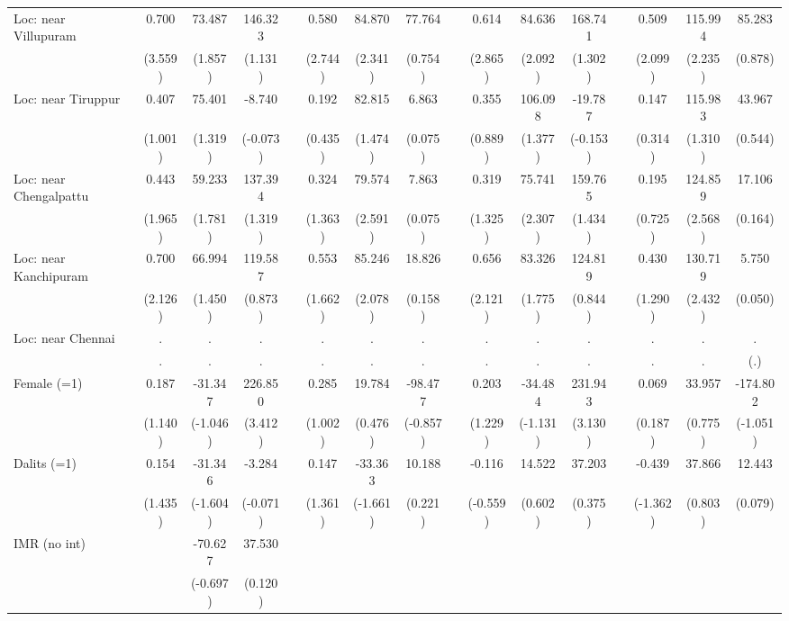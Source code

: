 {\begin{longtable}{@{\extracolsep{\fill}}lccccccccccccccc}
    Loc: near Villupuram & 0.700 & 73.487 & 146.323 &   & 0.580 & 84.870 & 77.764 &   & 0.614 & 84.636 & 168.741 &   & 0.509 & 115.994 & 85.283 \\
      & (3.559) & (1.857) & (1.131) &   & (2.744) & (2.341) & (0.754) &   & (2.865) & (2.092) & (1.302) &   & (2.099) & (2.235) & (0.878) \\
    Loc: near Tiruppur & 0.407 & 75.401 & -8.740 &   & 0.192 & 82.815 & 6.863 &   & 0.355 & 106.098 & -19.787 &   & 0.147 & 115.983 & 43.967 \\
      & (1.001) & (1.319) & (-0.073) &   & (0.435) & (1.474) & (0.075) &   & (0.889) & (1.377) & (-0.153) &   & (0.314) & (1.310) & (0.544) \\
    Loc: near Chengalpattu & 0.443 & 59.233 & 137.394 &   & 0.324 & 79.574 & 7.863 &   & 0.319 & 75.741 & 159.765 &   & 0.195 & 124.859 & 17.106 \\
      & (1.965) & (1.781) & (1.319) &   & (1.363) & (2.591) & (0.075) &   & (1.325) & (2.307) & (1.434) &   & (0.725) & (2.568) & (0.164) \\
    Loc: near Kanchipuram & 0.700 & 66.994 & 119.587 &   & 0.553 & 85.246 & 18.826 &   & 0.656 & 83.326 & 124.819 &   & 0.430 & 130.719 & 5.750 \\
      & (2.126) & (1.450) & (0.873) &   & (1.662) & (2.078) & (0.158) &   & (2.121) & (1.775) & (0.844) &   & (1.290) & (2.432) & (0.050) \\
    Loc: near Chennai & . & . & . &   & . & . & . &   & . & . & . &   & . & . & . \\
      & . & . & . &   & . & . & . &   & . & . & . &   & . & . & (.) \\
    Female (=1) & 0.187 & -31.347 & 226.850 &   & 0.285 & 19.784 & -98.477 &   & 0.203 & -34.484 & 231.943 &   & 0.069 & 33.957 & -174.802 \\
      & (1.140) & (-1.046) & (3.412) &   & (1.002) & (0.476) & (-0.857) &   & (1.229) & (-1.131) & (3.130) &   & (0.187) & (0.775) & (-1.051) \\
    Dalits (=1) & 0.154 & -31.346 & -3.284 &   & 0.147 & -33.363 & 10.188 &   & -0.116 & 14.522 & 37.203 &   & -0.439 & 37.866 & 12.443 \\
      & (1.435) & (-1.604) & (-0.071) &   & (1.361) & (-1.661) & (0.221) &   & (-0.559) & (0.602) & (0.375) &   & (-1.362) & (0.803) & (0.079) \\
    IMR (no int) &   & -70.627 & 37.530 &   &   &   &   &   &   &   &   &   &   &   &  \\
      &   & (-0.697) & (0.120) &   &   &   &   &   &   &   &   &   &   &   &  \\

\end{longtable}}
